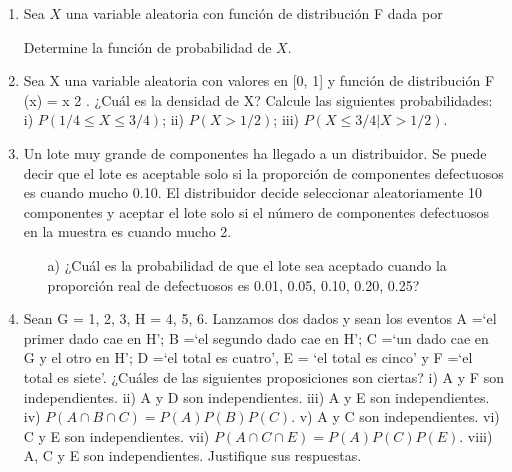 \documentclass[11pt,letterpaper]{article}
\begin{document}
\begin{enumerate}
\item Sea $X$ una variable aleatoria con función de distribución F dada por

Determine la función de probabilidad de $X$.


\item Sea X una variable aleatoria con valores en [0, 1] y función de distribución F (x) = x 2 . ¿Cuál es
la densidad de X? Calcule las siguientes probabilidades: i) $P (1/4 \leq X \leq 3/4)$; ii) $P(X > 1/2)$;
iii) $P(X \leq 3/4|X > 1/2)$.

\item Un lote muy grande de componentes ha llegado a un distribuidor. Se puede decir que el
lote es aceptable solo si la proporción de componentes defectuosos es cuando mucho 0.10.
El distribuidor decide seleccionar aleatoriamente 10 componentes y aceptar el lote solo si el
número de componentes defectuosos en la muestra es cuando mucho 2.

\begin{itemize}
\item[a)] ¿Cuál es la probabilidad de que el lote sea aceptado cuando la proporción real de defectuosos es 0.01, 0.05, 0.10, 0.20, 0.25?
\end{itemize}

\item Sean G = {1, 2, 3}, H = {4, 5, 6}. Lanzamos dos dados y sean los eventos A =‘el primer dado
cae en H’; B =‘el segundo dado cae en H’; C =‘un dado cae en G y el otro en H’; D =‘el
total es cuatro’, E = ‘el total es cinco’ y F =‘el total es siete’. ¿Cuáles de las siguientes proposiciones son ciertas? i) A y F son independientes. ii) A y D son independientes. iii) A
y E son independientes. iv) $P(A \cap B \cap C) = P (A)P (B)P (C)$. v) A y C son independientes.
vi) C y E son independientes. vii) $P (A \cap C \cap E) = P (A)P (C)P (E)$. viii) A, C y E son
independientes. Justifique sus respuestas.






\end{enumerate}
\end{document}
